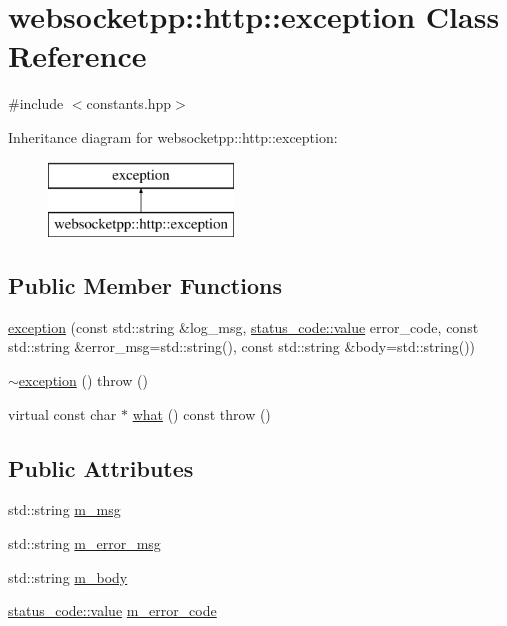 \hypertarget{classwebsocketpp_1_1http_1_1exception}{}\section{websocketpp\+:\+:http\+:\+:exception Class Reference}
\label{classwebsocketpp_1_1http_1_1exception}


{\ttfamily \#include $<$constants.\+hpp$>$}

Inheritance diagram for websocketpp\+:\+:http\+:\+:exception\+:\begin{figure}[H]
\begin{center}
\leavevmode
\includegraphics[height=2.000000cm]{classwebsocketpp_1_1http_1_1exception}
\end{center}
\end{figure}
\subsection*{Public Member Functions}
\begin{DoxyCompactItemize}
\item 
\hyperlink{classwebsocketpp_1_1http_1_1exception_a693f5feba657716d2bd20673951b5d28}{exception} (const std\+::string \&log\+\_\+msg, \hyperlink{namespacewebsocketpp_1_1http_1_1status__code_ae0d61c309e053ee5673517b54e2886c6}{status\+\_\+code\+::value} error\+\_\+code, const std\+::string \&error\+\_\+msg=std\+::string(), const std\+::string \&body=std\+::string())
\item 
\hyperlink{classwebsocketpp_1_1http_1_1exception_a477ee3e56c8b0a54d599d735b834663a}{$\sim$exception} ()  throw ()
\item 
virtual const char $\ast$ \hyperlink{classwebsocketpp_1_1http_1_1exception_a1c8f3c1df959a9f60f843ff48301f95c}{what} () const   throw ()
\end{DoxyCompactItemize}
\subsection*{Public Attributes}
\begin{DoxyCompactItemize}
\item 
std\+::string \hyperlink{classwebsocketpp_1_1http_1_1exception_a2be9d8a05bad1b10432fdf4e25159dfe}{m\+\_\+msg}
\item 
std\+::string \hyperlink{classwebsocketpp_1_1http_1_1exception_ab723cf4d6e80075e9a73da3b7577cdc3}{m\+\_\+error\+\_\+msg}
\item 
std\+::string \hyperlink{classwebsocketpp_1_1http_1_1exception_ac8a456ed1db5ead45831fdc61b216958}{m\+\_\+body}
\item 
\hyperlink{namespacewebsocketpp_1_1http_1_1status__code_ae0d61c309e053ee5673517b54e2886c6}{status\+\_\+code\+::value} \hyperlink{classwebsocketpp_1_1http_1_1exception_a169eaa70f405f073091194113fe75d0c}{m\+\_\+error\+\_\+code}
\end{DoxyCompactItemize}


